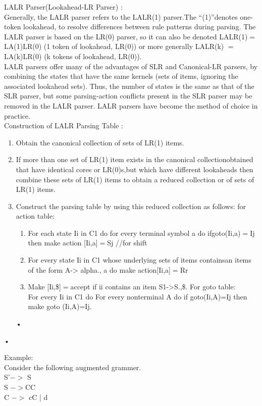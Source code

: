 \documentclass[11pt]{article}
\begin{document}
	\noindent
	LALR Parser(Lookahead-LR Parser) :\\
	Generally, the LALR parser refers to the LALR(1) parser.The “(1)”denotes one-token lookahead, to resolve differences between rule patterns during parsing. The LALR parser is based on the LR(0) parser, so it can also be denoted LALR(1)$ =$ LA(1)LR(0) (1 token of lookahead, LR(0)) or more generally LALR(k) $= $LA(k)LR(0) (k tokens of lookahead, LR(0)).\\
	
	LALR parsers offer many of the advantages of SLR and Canonical-LR parsers, by combining the states that have the same kernels (sets of items, ignoring the associated lookahead sets). Thus, the number of states is the same as that of the SLR parser, but some parsing-action conflicts present in the SLR parser may be removed in the LALR parser. LALR parsers have become the method of choice in practice.\\
	
	\noindent
	Construction of LALR Parsing Table :\\
	\begin{enumerate}
		\item Obtain the canonical collection of sets of LR(1) items.
		\item If more than one set of LR(1) item exists in the canonical collectionobtained that have identical cores or LR(0)s,but which have different lookaheads then combine these sets of LR(1) items to obtain a reduced collection or of sets of LR(1) items.
		\item Construct the parsing table by using this reduced collection as follows: for action table:
		\begin{enumerate}
			\item For each state Ii in C1 do for every terminal symbol a do ifgoto(Ii,a)$=$Ij then make action [Ii,a]$=$Sj //for shift
			\item For every state Ii in C1 whose underlying sets of items containsan items of the form A-> alpha., a do make action[Ii,a]$=$Rr
			\item Make [Ii,\$]$=$accept if ii contains an item S1->S.,\$. For goto table:\\
			For every Ii in C1 do For every nonterminal A do if goto(Ii,A)=Ij then make goto (Ii,A)=Ij.
		\end{enumerate}•
	\end{enumerate}•
	
	
	Example:\\
	Consider the following augmented grammer.\\
	S’$->$ S\\
	S $->$CC\\
	C $->$ cC | d\\
	
\end{document}
